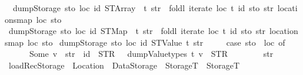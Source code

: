 \begin{isabellebody}
\ \ {\isachardoublequoteopen}dump\isactrlsub S\isactrlsub t\isactrlsub o\isactrlsub r\isactrlsub a\isactrlsub g\isactrlsub e\ sto\ loc\ id{\isacharprime}{\kern0pt}\ {\isacharparenleft}{\kern0pt}STArray\ {\isacharunderscore}{\kern0pt}\ t{\isacharparenright}{\kern0pt}\ str\ {\isacharequal}{\kern0pt}\ foldl\ {\isacharparenleft}{\kern0pt}iterate\ loc\ t\ id{\isacharprime}{\kern0pt}\ sto{\isacharparenright}{\kern0pt}\ str\ {\isacharparenleft}{\kern0pt}locations{\isacharunderscore}{\kern0pt}map\ loc\ sto{\isacharparenright}{\kern0pt}{\isachardoublequoteclose}\isanewline
{\isacharbar}{\kern0pt}\ {\isachardoublequoteopen}dump\isactrlsub S\isactrlsub t\isactrlsub o\isactrlsub r\isactrlsub a\isactrlsub g\isactrlsub e\ sto\ loc\ id{\isacharprime}{\kern0pt}\ {\isacharparenleft}{\kern0pt}STMap\ {\isacharunderscore}{\kern0pt}\ t{\isacharparenright}{\kern0pt}\ str\ {\isacharequal}{\kern0pt}\ foldl\ {\isacharparenleft}{\kern0pt}iterate\ loc\ t\ id{\isacharprime}{\kern0pt}\ sto{\isacharparenright}{\kern0pt}\ str\ {\isacharparenleft}{\kern0pt}locations{\isacharunderscore}{\kern0pt}map\ loc\ sto{\isacharparenright}{\kern0pt}{\isachardoublequoteclose}\isanewline
{\isacharbar}{\kern0pt}\ {\isachardoublequoteopen}dump\isactrlsub S\isactrlsub t\isactrlsub o\isactrlsub r\isactrlsub a\isactrlsub g\isactrlsub e\ sto\ loc\ id{\isacharprime}{\kern0pt}\ {\isacharparenleft}{\kern0pt}STValue\ t{\isacharparenright}{\kern0pt}\ str\ {\isacharequal}{\kern0pt}\isanewline
\ \ \ \ {\isacharparenleft}{\kern0pt}case\ sto\ {\isachardollar}{\kern0pt}{\isachardollar}{\kern0pt}\ loc\ of\isanewline
\ \ \ \ \ \ Some\ v\ {\isasymRightarrow}\ str\ {\isacharplus}{\kern0pt}\ id{\isacharprime}{\kern0pt}\ {\isacharplus}{\kern0pt}\ {\isacharparenleft}{\kern0pt}STR\ {\isacharprime}{\kern0pt}{\isacharprime}{\kern0pt}{\isacharequal}{\kern0pt}{\isacharequal}{\kern0pt}{\isacharprime}{\kern0pt}{\isacharprime}{\kern0pt}{\isacharparenright}{\kern0pt}\ {\isacharplus}{\kern0pt}\ dump\isactrlsub V\isactrlsub a\isactrlsub l\isactrlsub u\isactrlsub e\isactrlsub t\isactrlsub y\isactrlsub p\isactrlsub e\isactrlsub s\ t\ v\ {\isacharplus}{\kern0pt}\ {\isacharparenleft}{\kern0pt}STR\ {\isacharprime}{\kern0pt}{\isacharprime}{\kern0pt}{\isasymnewline}{\isacharprime}{\kern0pt}{\isacharprime}{\kern0pt}{\isacharparenright}{\kern0pt}\isanewline
\ \ \ \ {\isacharbar}{\kern0pt}\ {\isacharunderscore}{\kern0pt}\ {\isasymRightarrow}\ str{\isacharparenright}{\kern0pt}{\isachardoublequoteclose}\isanewline
\isanewline
{}\isamarkupfalse%
\ loadRec\isactrlsub S\isactrlsub t\isactrlsub o\isactrlsub r\isactrlsub a\isactrlsub g\isactrlsub e\ {\isacharcolon}{\kern0pt}{\isacharcolon}{\kern0pt}\ {\isachardoublequoteopen}Location\ {\isasymRightarrow}\ Data\isactrlsub S\isactrlsub t\isactrlsub o\isactrlsub r\isactrlsub a\isactrlsub g\isactrlsub e\ {\isasymRightarrow}\ StorageT\ {\isasymRightarrow}\ StorageT{\isachardoublequoteclose}\ \isanewline

\end{isabellebody}
